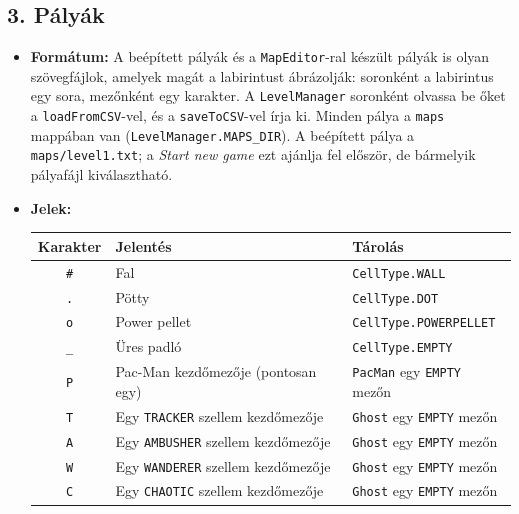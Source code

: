 \documentclass[11pt, a4paper]{article}
\begin{document}
\subsection*{3. Pályák}
\label{sec:custom_maps}
\begin{itemize}
    \item \textbf{Formátum:} A beépített pályák és a \texttt{MapEditor}-ral készült pályák is olyan szövegfájlok, amelyek magát a labirintust ábrázolják: soronként a labirintus egy sora, mezőnként egy karakter. A \texttt{LevelManager} soronként olvassa be őket a \texttt{loadFromCSV}-vel, és a \texttt{saveToCSV}-vel írja ki. Minden pálya a \texttt{maps} mappában van (\texttt{LevelManager.MAPS\_DIR}). A beépített pálya a \texttt{maps/level1.txt}; a \textit{Start new game} ezt ajánlja fel először, de bármelyik pályafájl kiválasztható.
    \item \textbf{Jelek:}

    \vspace{0.2cm}
    \begin{tabular}{@{}cll@{}}
        \toprule
        \textbf{Karakter} & \textbf{Jelentés} & \textbf{Tárolás} \\
        \midrule
        \texttt{\#} & Fal & \texttt{CellType.WALL} \\
        \texttt{.} & Pötty & \texttt{CellType.DOT} \\
        \texttt{o} & Power pellet & \texttt{CellType.POWERPELLET} \\
        \texttt{\_} & Üres padló & \texttt{CellType.EMPTY} \\
        \texttt{P} & Pac-Man kezdőmezője (pontosan egy) & \texttt{PacMan} egy \texttt{EMPTY} mezőn \\
        \texttt{T} & Egy \texttt{TRACKER} szellem kezdőmezője & \texttt{Ghost} egy \texttt{EMPTY} mezőn \\
        \texttt{A} & Egy \texttt{AMBUSHER} szellem kezdőmezője & \texttt{Ghost} egy \texttt{EMPTY} mezőn \\
        \texttt{W} & Egy \texttt{WANDERER} szellem kezdőmezője & \texttt{Ghost} egy \texttt{EMPTY} mezőn \\
        \texttt{C} & Egy \texttt{CHAOTIC} szellem kezdőmezője & \texttt{Ghost} egy \texttt{EMPTY} mezőn \\
        \bottomrule
    \end{tabular}
    \vspace{0.2cm}


\end{itemize}
\end{document}
